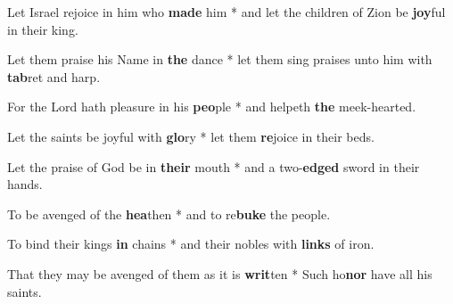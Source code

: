 \begin{multicols}{2}
	Let Israel rejoice in him who \textbf{made} him * and let the children of Zion be \textbf{joy}ful in their king.
	
	Let them praise his Name in \textbf{the} dance * let them sing praises unto him with \textbf{tab}ret and harp.
	
	For the Lord hath pleasure in his \textbf{peo}ple * and helpeth \textbf{the} meek-hearted.
	
	Let the saints be joyful with \textbf{glo}ry * let them \textbf{re}joice in their beds.
	
	Let the praise of God be in \textbf{their} mouth * and a two-\textbf{edged} sword in their hands.
	
	To be avenged of the \textbf{hea}then * and to re\textbf{buke} the people.
	
	To bind their kings \textbf{in} chains * and their nobles with \textbf{links} of iron.
	
	That they may be avenged of them as it is \textbf{writ}ten * Such ho\textbf{nor} have all his saints.
\end{multicols}